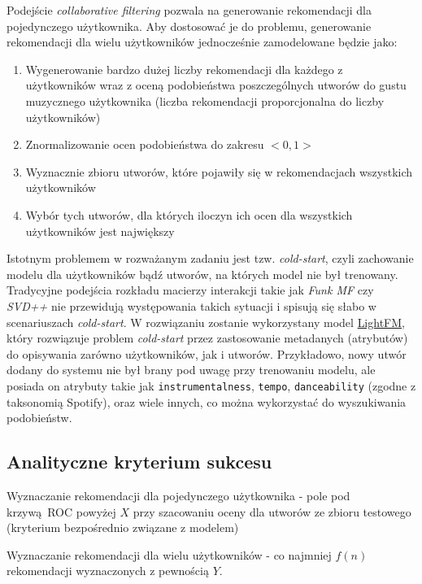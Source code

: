 \documentclass[10pt,a4paper]{article}
\begin{document}
Podejście \textit{collaborative filtering} pozwala na generowanie rekomendacji dla pojedynczego użytkownika. Aby dostosować je do problemu, generowanie rekomendacji dla wielu użytkowników jednocześnie zamodelowane będzie jako:
\begin{enumerate}

\item Wygenerowanie bardzo dużej liczby rekomendacji dla każdego z użytkowników wraz z oceną podobieństwa poszczególnych utworów do gustu muzycznego użytkownika (liczba rekomendacji proporcjonalna do liczby użytkowników)
\item Znormalizowanie ocen podobieństwa do zakresu $<0, 1>$
\item Wyznacznie zbioru utworów, które pojawiły się w rekomendacjach wszystkich użytkowników
\item Wybór tych utworów, dla których iloczyn ich ocen dla wszystkich użytkowników jest największy

\end{enumerate}

Istotnym problemem w rozważanym zadaniu jest tzw. \textit{cold-start}, czyli zachowanie modelu dla użytkowników bądź utworów, na których model nie był trenowany. Tradycyjne podejścia rozkładu macierzy interakcji takie jak \textit{Funk MF} czy \textit{SVD++} nie przewidują występowania takich sytuacji i spisują się słabo w scenariuszach \textit{cold-start}. W rozwiązaniu zostanie wykorzystany model \href{https://arxiv.org/pdf/1507.08439.pdf}{LightFM}, który rozwiązuje problem \textit{cold-start} przez zastosowanie metadanych (atrybutów) do opisywania zarówno użytkowników, jak i utworów. Przykładowo, nowy utwór dodany do systemu nie był brany pod uwagę przy trenowaniu modelu, ale posiada on atrybuty takie jak \texttt{instrumentalness}, \texttt{tempo}, \texttt{danceability} (zgodne z taksonomią Spotify), oraz wiele innych, co można wykorzystać do wyszukiwania podobieństw. 

\subsection*{Analityczne kryterium sukcesu}

Wyznaczanie rekomendacji dla pojedynczego użytkownika - pole pod krzywą ROC powyżej $X$ przy szacowaniu oceny dla utworów ze zbioru testowego (kryterium bezpośrednio związane z modelem)

Wyznaczanie rekomendacji dla wielu użytkowników - co najmniej $f(n)$ rekomendacji wyznaczonych z pewnością $Y$.
\end{document}
